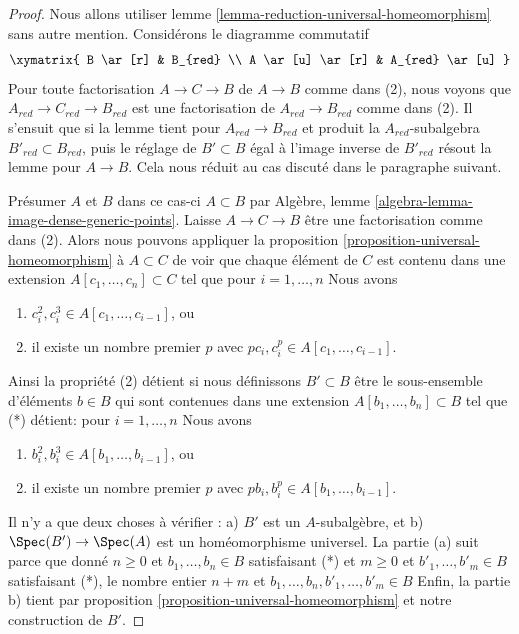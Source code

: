 \begin{proof}
Nous allons utiliser lemme \ref{lemma-reduction-universal-homeomorphism} sans autre mention. Considérons le diagramme commutatif $$
\xymatrix{
B \ar[r] & B_{red} \\
A \ar[u] \ar[r] & A_{red} \ar[u]
}
$$ Pour toute factorisation $A \to C \to B$ de $A \to B$ comme dans (2), nous voyons que $A_{red} \to C_{red} \to B_{red}$ est une factorisation de $A_{red} \to B_{red}$ comme dans (2). Il s'ensuit que si la lemme tient pour $A_{red} \to B_{red}$ et produit la $A_{red}$-subalgebra $B'_{red} \subset B_{red}$, puis le réglage de $B' \subset B$ égal à l'image inverse de $B'_{red}$ résout la lemme pour $A \to B$. Cela nous réduit au cas discuté dans le paragraphe suivant.

\medskip\noindent

Présumer $A$ et $B$ dans ce cas-ci $A \subset B$ par Algèbre, lemme \ref{algebra-lemma-image-dense-generic-points}. Laisse $A \to C \to B$ être une factorisation comme dans (2). Alors nous pouvons appliquer la proposition \ref{proposition-universal-homeomorphism}
à $A \subset C$ de voir que chaque élément de $C$ est contenu dans une extension $A[c_1, \ldots, c_n] \subset C$ tel que pour
$i = 1, \ldots, n$ Nous avons

\begin{enumerate}

\item  $c_i^2, c_i^3 \in A[c_1, \ldots, c_{i - 1}]$, ou
\item il existe un nombre premier $p$ avec
$pc_i, c_i^p \in A[c_1, \ldots, c_{i - 1}]$.

\end{enumerate}

Ainsi la propriété (2) détient si nous définissons $B' \subset B$ être le sous-ensemble d'éléments $b \in B$ qui sont contenues dans une extension
$
A[b_1, \ldots, b_n] \subset B
$
tel que (*) détient: pour $i = 1, \ldots, n$ Nous avons

\begin{enumerate}

\item  $b_i^2, b_i^3 \in A[b_1, \ldots, b_{i - 1}]$, ou
\item il existe un nombre premier $p$ avec
$pb_i, b_i^p \in A[b_1, \ldots, b_{i - 1}]$.

\end{enumerate}

Il n'y a que deux choses à vérifier : a) $B'$ est un $A$-subalgèbre, et b) $\Spec(B') \to \Spec(A)$ est un homéomorphisme universel. La partie (a) suit parce que donné $n \geq 0$ et $b_1, \ldots, b_n \in B$
satisfaisant (*) et $m \geq 0$ et $b'_1, \ldots, b'_m \in B$
satisfaisant (*), le nombre entier
$n + m$ et $b_1, \ldots, b_n, b'_1, \ldots, b'_m \in B$
Enfin, la partie b) tient par proposition \ref{proposition-universal-homeomorphism} et notre construction de $B'$.

\end{proof}

